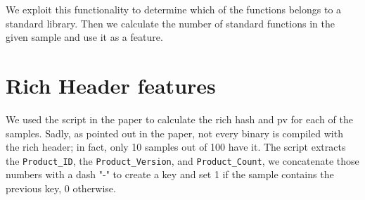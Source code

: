 We exploit this functionality to determine which of the functions belongs to a standard library. Then we calculate the number of standard functions in the given sample and use it as a feature.

\section{Rich Header features}
We used the script in the paper to calculate the rich hash and pv for each of the samples. Sadly, as pointed out in the paper, not every binary is compiled with the rich header; in fact, only 10 samples out of 100 have it. The script extracts the \texttt{Product\_ID}, the \texttt{Product\_Version}, and \texttt{Product\_Count}, we concatenate those numbers with a dash "-" to create a key and set 1 if the sample contains the previous key, 0 otherwise.

